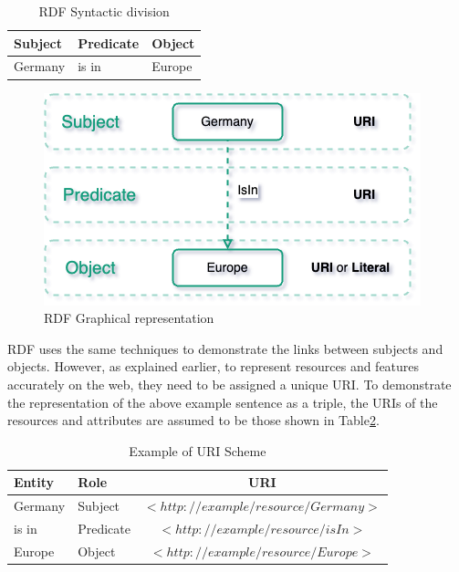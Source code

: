     \begin{table}[H]
        \centering
	    \begin{tabular}{ | m{4cm} | m{4cm} | m{4cm} | }
            \hline
            \rowcolor{teal!30} Subject & Predicate & Object \\
            
            \hline
            Germany  & is in & Europe\\
            
            \hline
        \end{tabular}
        \caption{\label{tab:rdf-example} RDF Syntactic division}
        \end{table}
        
    \begin{figure}[H]
        \centering
        \includegraphics[scale=0.6]{images/Foundation-RDF Example.drawio.png}
        \caption{\label{fig:rdf-example}  RDF Graphical representation}
    \end{figure}

    RDF uses the same techniques to demonstrate the links between subjects and objects. However, as explained earlier, to represent resources and features accurately on the web, they need to be assigned a unique URI. To demonstrate the representation of the above example sentence as a triple, the URIs of the resources and attributes are assumed to be those shown in Table\ref{tab:rdf-example-uri}.
    
    \begin{table}[H]
        \centering
	    {
	    \begin{tabular}{ | m{2.5cm} | m{2.5cm} | c | }
            \hline
            \rowcolor{teal!30} Entity & Role & URI \\
            
            \hline
            Germany  & Subject & $<http://example/resource/Germany>$\\
            
            \hline
            is in  & Predicate & $<http://example/resource/isIn>$\\
            
            \hline
            Europe  & Object & $<http://example/resource/Europe>$\\
            
            \hline
        \end{tabular}}
        \caption{\label{tab:rdf-example-uri} Example of URI Scheme}
    \end{table}

